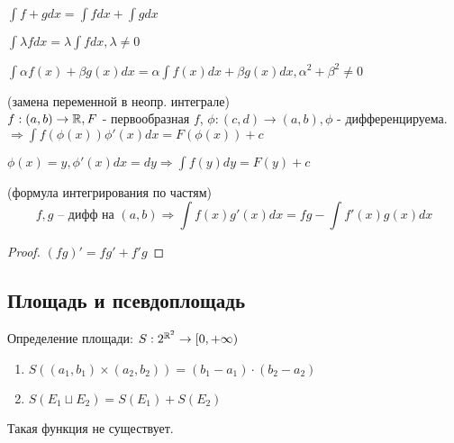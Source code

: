 \begin{properties}
    \item $\int f + g dx = \int f dx + \int g dx$
    
    \item $\int \lambda f dx = \lambda \int f dx, \lambda \neq 0$
        
    \item $\int \alpha f(x) + \beta g(x) dx = \alpha \int f(x) dx + \beta g(x) dx, \alpha^2 + \beta^2 \neq 0$
        
    \item (замена переменной в неопр. интеграле) \\
    $f : (a, b) \rightarrow \mathbb{R}, F$ - первообразная $f$, $\phi:(c, d) \rightarrow (a, b), 
    \phi$ - дифференцируема. \\
    $\Rightarrow \int f(\phi(x))\phi'(x) dx = F(\phi(x)) + c$
    \begin{remark}
        $\phi(x) = y, \phi'(x)dx = dy \Rightarrow \int f(y) dy = F(y) + c$
    \end{remark}

    \item(формула интегрирования по частям) \\
    \[f, g\text{ -- дифф на }(a, b) \Rightarrow \int f(x)g'(x)dx = fg - \int f'(x)g(x)dx\]
    \begin{proof}
        $(fg)' = fg' + f'g$
    \end{proof}

\end{properties}




\subsection{Площадь и псевдоплощадь}

\begin{definition}
    Определение площади: $S : 2 ^ {\mathbb{R} ^ 2} \rightarrow [0, +\infty)$
    \begin{enumerate}
        \item $S((a_1, b_1) \times (a_2, b_2)) = (b_1 - a_1) \cdot (b_2 - a_2)$
        \item $S(E_1 \sqcup E_2) = S(E_1) + S(E_2)$
    \end{enumerate}
\end{definition}

\begin{remark}
    Такая функция не существует.
\end{remark}


